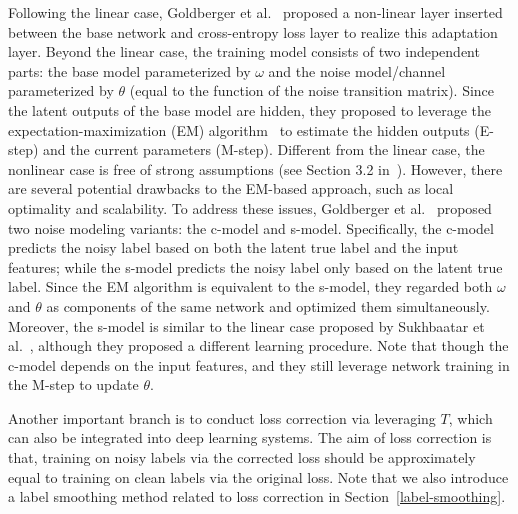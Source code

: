 Following the linear case, Goldberger et al.~ proposed a non-linear layer inserted between the base network and cross-entropy loss layer to realize this adaptation layer.
Beyond the linear case, the training model consists of two independent parts: the base model parameterized by $\omega$ and the noise model/channel parameterized by $\theta$ (equal to the function of the noise transition matrix). Since the latent outputs 
of the base model are hidden, they proposed to leverage the expectation-maximization (EM) algorithm~ to estimate the hidden outputs (E-step) and the current parameters (M-step). Different from the linear case, the nonlinear case is free of strong assumptions (see Section 3.2 in~).
However, there are several potential drawbacks to the EM-based approach, such as local optimality and scalability. To address these issues, Goldberger et al.~ proposed two noise modeling variants: the c-model and s-model. Specifically, the c-model predicts the noisy label based on both the latent true label and the input features; while the s-model predicts the noisy label only based on the latent true label. Since the EM algorithm is equivalent to the s-model, they regarded both $\omega$ and $\theta$ as components of the same network and optimized them simultaneously. Moreover, the s-model is similar to the linear case proposed by Sukhbaatar et al.~, although they proposed a different learning procedure. Note that though the c-model depends on the input features, and they still leverage network training in the M-step to update $\theta$.

Another important branch is to conduct loss correction via leveraging  $T$, 
which can  also be integrated into deep learning systems. 
The aim of loss correction is that, training on noisy labels via the corrected loss should be approximately equal to training on clean labels via the original loss.
Note that we also introduce a label smoothing method related to loss correction in Section~\ref{label-smoothing}.

